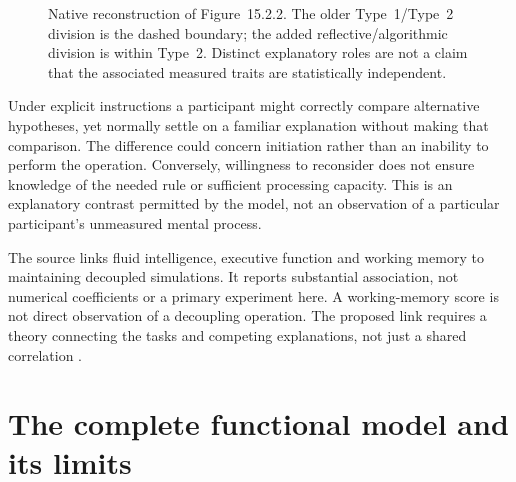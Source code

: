\begin{figure}[htbp]
\centering
{}
\caption{Native reconstruction of Figure~15.2.2. The older Type~1/Type~2
division is the dashed boundary; the added reflective/algorithmic division
is within Type~2. Distinct explanatory roles are not a claim that the
associated measured traits are statistically independent.}
\label{fig:p19-rat152-tripartite}
\end{figure}

Under explicit instructions a participant might correctly compare alternative
hypotheses, yet normally settle on a familiar explanation without making
that comparison. The difference could concern initiation rather than an
inability to perform the operation. Conversely, willingness to reconsider
does not ensure knowledge of the needed rule or sufficient processing
capacity. This is an explanatory contrast permitted by the model, not
an observation of a particular participant's unmeasured mental process.

The source links fluid intelligence, executive function and working memory
to maintaining decoupled simulations. It reports substantial association,
not numerical coefficients or a primary experiment here. A working-memory
score is not direct observation of a decoupling operation. The proposed
link requires a theory connecting the tasks and competing explanations,
not just a shared correlation
\cite[secs.~4--5, pp.~794--795]{StanovichToplakWest2021Intelligence}.

\section{The complete functional model and its limits}
\label{sec:p19-rat152-functions}

